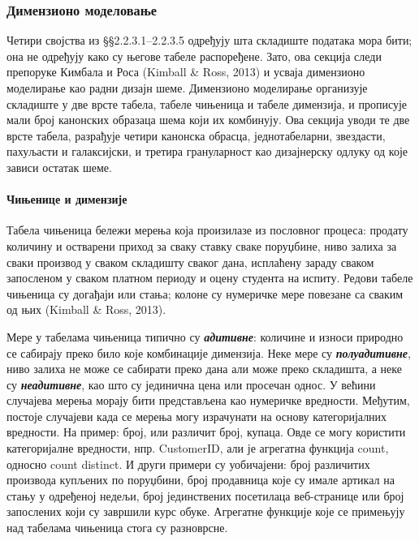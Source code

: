 \subsubsection{Димензионо моделовање}
Четири својства из §§2.2.3.1–2.2.3.5 одређују шта складиште података мора бити; она не одређују како су његове табеле распоређене. Зато, ова секција следи препоруке Кимбала и Роса (Kimball \& Ross, 2013) и усваја димензионо моделирање као радни дизајн шеме. Димензионо моделирање организује складиште у две врсте табела, табеле чињеница и табеле димензија, и прописује мали број канонских образаца шема који их комбинују. Ова секција уводи те две врсте табела, разрађује четири канонска обрасца, једнотабеларни, звездасти, пахуљасти и галаксијски, и третира грануларност као дизајнерску одлуку од које зависи остатак шеме.

\paragraph{Чињенице и димензије}
Табела чињеница бележи мерења која произилазе из пословног процеса: продату количину и остварени приход за сваку ставку сваке поруџбине, ниво залиха за сваки производ у сваком складишту сваког дана, исплаћену зараду сваком запосленом у сваком платном периоду и оцену студента на испиту. Редови табеле чињеница су догађаји или стања; колоне су нумеричке мере повезане са сваким од њих (Kimball \& Ross, 2013). 

Мере у табелама чињеница типично су \textbf{\textit{адитивне}}: количине и износи природно се сабирају преко било које комбинације димензија. Неке мере су \textbf{\textit{полуадитивне}}, ниво залиха не може се сабирати преко дана али може преко складишта, а неке су \textbf{\textit{неадитивне}}, као што су јединична цена или просечан однос. У већини случајева мерења морају бити представљена као нумеричке вредности. Међутим, постоје случајеви када се мерења могу израчунати на основу категоријалних вредности. На пример: број, или различит број, купаца. Овде се могу користити категоријалне вредности, нпр. CustomerID, али је агрегатна функција count, односно count distinct. И други примери су уобичајени: број различитих производа купљених по поруџбини, број продавница које су имале артикал на стању у одређеној недељи, број јединствених посетилаца веб-странице или број запослених који су завршили курс обуке. Агрегатне функције које се примењују над табелама чињеница стога су разноврсне. 

